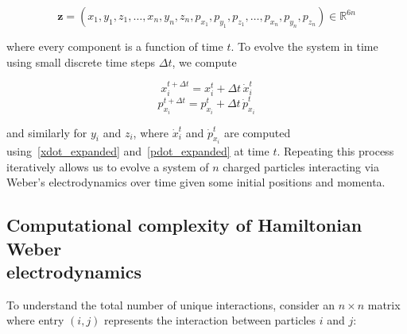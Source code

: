 \documentclass[12pt,a4paper]{article}
\theoremstyle{definition}
\theoremstyle{remark}
\begin{document}
\begin{equation}\label{z}
    \mathbf{z} = (x_1, y_1, z_1, \ldots, x_n, y_n, z_n, p_{x_1}, p_{y_1}, p_{z_1}, \ldots, p_{x_n}, p_{y_n}, p_{z_n}) \in \mathbb{R}^{6n}
\end{equation}

where every component is a function of time $t$. To evolve the system in time using small discrete time steps $\Delta t$, we compute

\begin{equation}\label{update_step_x}
    x_i^{t + \Delta t} = x_i^t + \Delta t \, \dot{x}_i^t
\end{equation}
\begin{equation}\label{update_step_p}
    p_{x_i}^{t + \Delta t} = p_{x_i}^t + \Delta t \, \dot{p}_{x_i}^t
\end{equation}

and similarly for $y_i$ and $z_i$, where $\dot{x}_i^t$ and $\dot{p}_{x_i}^t$ are computed using~\eqref{xdot_expanded} and~\eqref{pdot_expanded} at time $t$. Repeating this process iteratively allows us to evolve a system of $n$ charged particles interacting via Weber's electrodynamics over time given some initial positions and momenta.

\subsection[Computational complexity of Hamiltonian Weber electrodynamics]{Computational complexity of Hamiltonian Weber \\ electrodynamics}\label{complexity}
To understand the total number of unique interactions, consider an $n \times n$ matrix where entry $(i,j)$ represents the interaction between particles $i$ and $j$:
\end{document}
